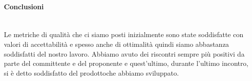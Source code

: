 		\paragraph*{Conclusioni} \mbox{} \\ [1mm]
		Le metriche di qualità che ci siamo posti inizialmente sono state soddisfatte con valori di accettabilità e spesso anche di ottimalità quindi siamo abbastanza soddisfatti del nostro lavoro. Abbiamo avuto dei riscontri sempre più positivi da parte del committente e del proponente e quest'ultimo, durante l'ultimo incontro, si è detto soddisfatto del prodotto\glosp che abbiamo sviluppato.
		
		